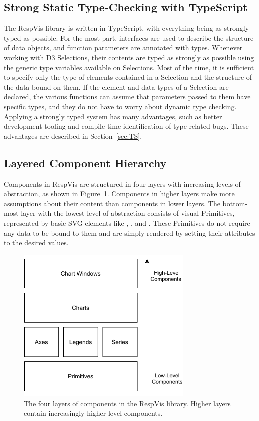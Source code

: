 \subsection{Strong Static Type-Checking with TypeScript}

The RespVis library is written in TypeScript, with everything being as
strongly-typed as possible. For the most part, interfaces are used to
describe the structure of data objects, and function parameters are
annotated with types. Whenever working with D3 Selections, their
contents are typed as strongly as possible using the generic type
variables available on Selections. Most of the time, it is sufficient
to specify only the type of elements contained in a Selection and the
structure of the data bound on them. If the element and data types of
a Selection are declared, the various functions can assume that
parameters passed to them have specific types, and they do not have to
worry about dynamic type checking. Applying a strongly typed system
has many advantages, such as better development tooling and
compile-time identification of type-related bugs. These advantages are
described in Section~\ref{sec:TS}.







\subsection{Layered Component Hierarchy}

Components in RespVis are structured in four layers with increasing
levels of abstraction, as shown in Figure~\ref{fig:Layers}. Components
in higher layers make more assumptions about their content than
components in lower layers. The bottom-most layer with the lowest
level of abstraction consists of visual Primitives, represented by
basic SVG elements like , , and
. These Primitives do not require any data to be bound to
them and are simply rendered by setting their attributes to the
desired values.


\begin{figure}[tp]
\centering
\includegraphics[keepaspectratio,width=\linewidth,height=7.5cm]
{diagrams/respvis-layers.pdf}
\caption[Component Layers of RespVis]{
The four layers of components in the RespVis library. Higher layers
contain increasingly higher-level components.
}
\label{fig:Layers}
\end{figure}


